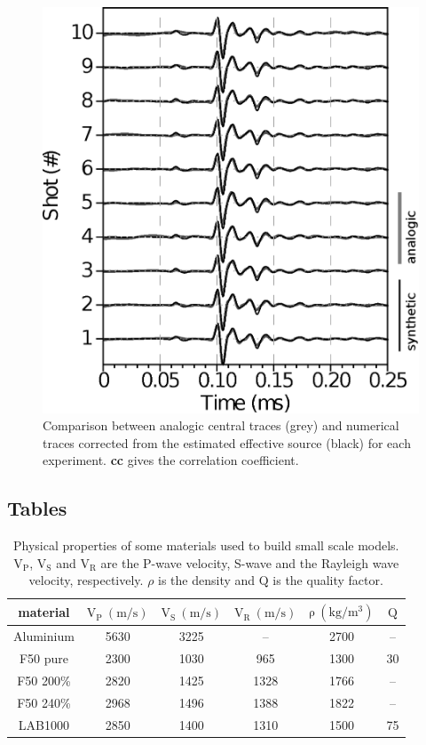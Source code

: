 \documentclass[manuscript,revised]{geophysics}
\begin{document}
\begin{figure}[!h]
	\centering
	\includegraphics[scale=1.0]{fig/spec_F50_CT_COMP.eps}
	\caption{Comparison between analogic central traces (grey) and numerical traces corrected from the estimated effective source (black) for each experiment. \textbf{cc} gives the correlation coefficient.}
	\label{panel_srcest_2d_mean_comp}
\end{figure}

\clearpage
\newpage

\subsection*{Tables}

\begin{table}[!ht]
	\centering
	\begin{tabular}{cccccc}
		\hline
		material & $\mathrm{V_{P}\ (m/s)}$ & $\mathrm{V_{S}\ (m/s)}$ & $\mathrm{V_{R}\ (m/s)}$ & $\mathrm{\rho\ (kg/m^{3})}$ & $\mathrm{Q}$ \\
		\hline
		Aluminium & 5630 & 3225 & --   & 2700 & --  \\
		F50 pure  & 2300 & 1030 & 965  & 1300 & 30  \\
		F50 200\% & 2820 & 1425 & 1328 & 1766 & --  \\
		F50 240\% & 2968 & 1496 & 1388 & 1822 & --  \\
		LAB1000   & 2850 & 1400 & 1310 & 1500 & 75  \\
		\hline
	\end{tabular}
	\caption{Physical properties of some materials used to build small scale models. $\mathrm{V_{P}}$, $\mathrm{V_{S}}$ and $\mathrm{V_{R}}$ are the P-wave velocity, S-wave and the Rayleigh wave velocity, respectively. $\rho$ is the density and $\mathrm{Q}$ is the quality factor.}
	\label{epoxy-resin}
\end{table}
\end{document}
